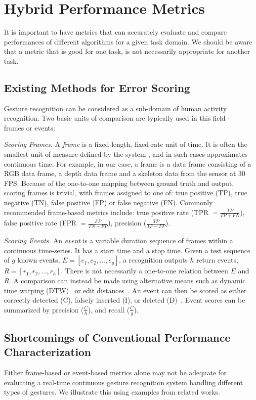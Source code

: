 \chapter{Hybrid Performance Metrics}
It is important to have metrics that can accurately evaluate and compare
performances of different algorithms for a given task domain. We should
be aware that a metric that is good for one task, is not
necessarily appropriate for another task. 

\section{Existing Methods for Error Scoring}
Gesture recognition can be considered as a sub-domain of human activity
recognition. Two basic units of comparison are typically used in this field
-- frames or events:

\textit{Scoring Frames.} A \textit{frame} is a fixed-length,
fixed-rate unit of time. It is often the smallest unit of measure defined by the system \cite{ward11}, and in such cases approximates continuous time.
For example, in our case, a frame is a data frame consisting of a RGB data frame, a depth data frame and a skeleton data from the
sensor at 30 FPS. Because of the one-to-one mapping between ground truth and
output, scoring frames is trivial, with frames assigned to one of: true positive
(TP), true negative (TN), false positive (FP) or false negative (FN). Commonly
recommended frame-based metrics include: true positive rate (TPR $= \frac{TP}{TP
+ FN}$), false positive rate (FPR $= \frac{FP}{TN + FP}$), precision
($\frac{TP}{TP + FP}$).

\textit{Scoring Events.} An \textit{event} is a variable duration sequence of
frames within a continuous time-series.  It has a start time and a stop time.
Given a test sequence of $g$ known events, $E = [e_1, e_2, \ldots, e_g]$, a
recognition outputs $h$ return events, $R = [r_1, r_2, \ldots, r_h]$. There is
not necessarily a one-to-one relation between $E$ and $R$. A comparison can
instead be made using alternative means such as dynamic time warping
(DTW)~\cite{berndt94} or edit distances~\cite{guyon13}. An event can then be
scored as either correctly detected (C), falsely inserted (I), or deleted
(D)~\cite{ward11}. Event scores can be summarized
by precision ($\frac{C}{h}$), and recall
($\frac{C}{g}$).

\section{Shortcomings of Conventional Performance Characterization}
Either frame-based or event-based metrics 
alone may not be adequate for evaluating a real-time continuous gesture recognition system handling different types of gestures. We illustrate this using examples from related works.

